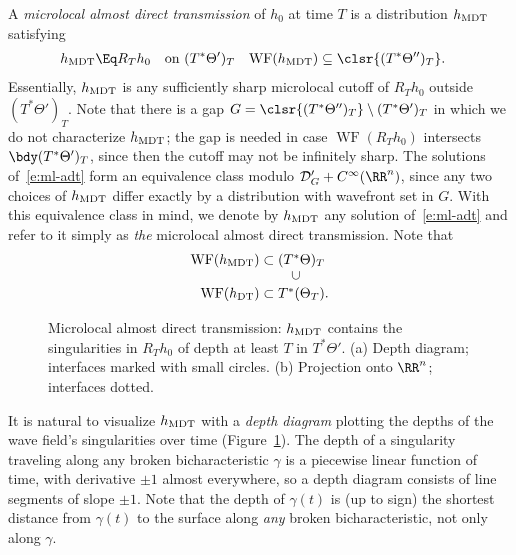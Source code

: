 \documentclass[10pt]{article}
\theoremstyle{plain}
\theoremstyle{definition}
\theoremstyle{remark}
\numberwithin{theorem}{section}
\numberwithin{example}{section}
\numberwithin{equation}{section}
\numberwithin{figure}{section}
\DeclareMathOperator\WF{WF}		%
\newcommand\DT{\ensuremath{_{\text{\normalfont DT}}}}		%
\newcommand\MDT{\ensuremath{_{\text{\normalfont MDT}}}}	%
\newcommand\eqml{\Eq}					%
\begin{document}
A \emph{microlocal almost direct transmission} of $h_0$ at time $T$ is a distribution $h\MDT$ satisfying
\begin{align}
	h\MDT  &\eqml R_Th_0 \quad\text{on $(T^*\Theta')_T$}
	&
	\WF(h\MDT) &\subseteq \clsr{(T^*\Theta'')_T}.
	\label{e:ml-adt}
\end{align}
Essentially, $h\MDT$ is any sufficiently sharp microlocal cutoff of $R_Th_0$ outside $(T^*\Theta')_T$. Note that there is a gap $G=\clsr{(T^*\Theta'')_T}\setminus (T^*\Theta')_T$ in which we do not characterize $h\MDT$; the gap is needed in case $\WF(R_Th_0)$ intersects $\bdy(T^*\Theta')_T$, since then the cutoff may not be infinitely sharp. The solutions of~\eqref{e:ml-adt} form an equivalence class modulo $\mathcal D'_G+C^\infty(\RR^n)$, since any two choices of $h\MDT$ differ exactly by a distribution with wavefront set in $G$. With this equivalence class in mind, we denote by $h\MDT$ any solution of~\eqref{e:ml-adt} and refer to it simply as \emph{the} microlocal almost direct transmission. Note that
\begin{equation}
	\begin{array}{r@{\;}c@{\;}l}
		\WF(h\MDT) 	& \subset 	& (T^*\Theta)_T\\
					&		& \quad\rotatebox{90}{$\subset$}\\
		\WF(h\DT) 	& \subset 	& T^*(\Theta_T).\\					
	\end{array}
\end{equation}
%
\begin{figure}
	\centering
	\hbox{}\hfill
	\hfill
	\hfill\hbox{}
	\caption{Microlocal almost direct transmission: $h\MDT$ contains the singularities in $R_Th_0$ of depth at least $T$ in $T^*\Theta'$. (a) Depth diagram; interfaces marked with small circles. (b) Projection onto $\RR^n$; interfaces dotted.}
	\label{f:ml-mdt-depth}
\end{figure}%
%
It is natural to visualize $h\MDT$ with a \emph{depth diagram} plotting the depths of the wave field's singularities over time (Figure~\ref{f:ml-mdt-depth}). The depth of a singularity traveling along any broken bicharacteristic $\gamma$ is a piecewise linear function of time, with derivative $\pm1$ almost everywhere, so a depth diagram consists of line segments of slope $\pm1$. Note that the depth of $\gamma(t)$ is (up to sign) the shortest distance from $\gamma(t)$ to the surface along \emph{any} broken bicharacteristic, not only along $\gamma$.
\end{document}

